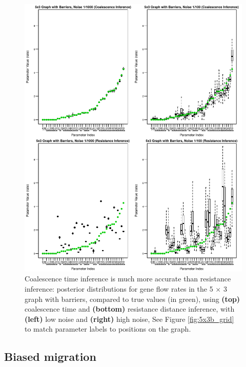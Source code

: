 \documentclass{article}
\begin{document}
\begin{figure}
\centering
     \includegraphics[scale=1]{figs/5x3b_post_coalvcom}
    \caption{
        Coalescence time inference is much more accurate than resistance inference:
        posterior distributions for gene flow rates in the 5 $\times$ 3 graph with barriers,
        compared to true values (in green),
        using \textbf{(top)} coalescence time and \textbf{(bottom)} resistance distance inference,
        with \textbf{(left)} low noise and \textbf{(right)} high noise,
        See Figure \ref{fig:5x3b_grid} to match parameter labels to positions on the graph.
    \label{fig:5x3b_post_coalvcom}
}
\end{figure}


\subsection*{Biased migration}
\label{sec:biased_migration}
\end{document}

